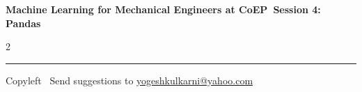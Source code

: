 \documentclass[8pt,landscape]{article}
\begin{document}
\footnotesize

\begin{center}
\Large{\textbf{Machine Learning for Mechanical Engineers at CoEP\ Session 4: Pandas}}
\end{center}

\begin{multicols}{2}

\end{multicols}

\rule{\linewidth}{0.25pt}
\scriptsize
Copyleft \textcopyleft\  Send suggestions to
\href{http://www.yogeshkulkarni.com}{yogeshkulkarni@yahoo.com}
\end{document}
